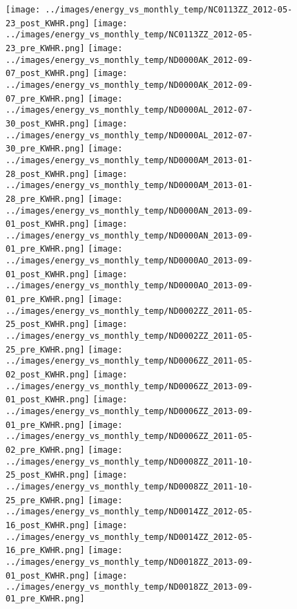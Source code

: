 \clearpage
\begin{figure}
\centering
\texttt{[image: ../images/energy\_vs\_monthly\_temp/NC0113ZZ\_2012-05-23\_post\_KWHR.png]}
\texttt{[image: ../images/energy\_vs\_monthly\_temp/NC0113ZZ\_2012-05-23\_pre\_KWHR.png]}
\texttt{[image: ../images/energy\_vs\_monthly\_temp/ND0000AK\_2012-09-07\_post\_KWHR.png]}
\texttt{[image: ../images/energy\_vs\_monthly\_temp/ND0000AK\_2012-09-07\_pre\_KWHR.png]}
\texttt{[image: ../images/energy\_vs\_monthly\_temp/ND0000AL\_2012-07-30\_post\_KWHR.png]}
\texttt{[image: ../images/energy\_vs\_monthly\_temp/ND0000AL\_2012-07-30\_pre\_KWHR.png]}
\texttt{[image: ../images/energy\_vs\_monthly\_temp/ND0000AM\_2013-01-28\_post\_KWHR.png]}
\texttt{[image: ../images/energy\_vs\_monthly\_temp/ND0000AM\_2013-01-28\_pre\_KWHR.png]}
\texttt{[image: ../images/energy\_vs\_monthly\_temp/ND0000AN\_2013-09-01\_post\_KWHR.png]}
\texttt{[image: ../images/energy\_vs\_monthly\_temp/ND0000AN\_2013-09-01\_pre\_KWHR.png]}
\texttt{[image: ../images/energy\_vs\_monthly\_temp/ND0000AO\_2013-09-01\_post\_KWHR.png]}
\texttt{[image: ../images/energy\_vs\_monthly\_temp/ND0000AO\_2013-09-01\_pre\_KWHR.png]}
\texttt{[image: ../images/energy\_vs\_monthly\_temp/ND0002ZZ\_2011-05-25\_post\_KWHR.png]}
\texttt{[image: ../images/energy\_vs\_monthly\_temp/ND0002ZZ\_2011-05-25\_pre\_KWHR.png]}
\texttt{[image: ../images/energy\_vs\_monthly\_temp/ND0006ZZ\_2011-05-02\_post\_KWHR.png]}
\texttt{[image: ../images/energy\_vs\_monthly\_temp/ND0006ZZ\_2013-09-01\_post\_KWHR.png]}
\texttt{[image: ../images/energy\_vs\_monthly\_temp/ND0006ZZ\_2013-09-01\_pre\_KWHR.png]}
\texttt{[image: ../images/energy\_vs\_monthly\_temp/ND0006ZZ\_2011-05-02\_pre\_KWHR.png]}
\texttt{[image: ../images/energy\_vs\_monthly\_temp/ND0008ZZ\_2011-10-25\_post\_KWHR.png]}
\texttt{[image: ../images/energy\_vs\_monthly\_temp/ND0008ZZ\_2011-10-25\_pre\_KWHR.png]}
\texttt{[image: ../images/energy\_vs\_monthly\_temp/ND0014ZZ\_2012-05-16\_post\_KWHR.png]}
\texttt{[image: ../images/energy\_vs\_monthly\_temp/ND0014ZZ\_2012-05-16\_pre\_KWHR.png]}
\texttt{[image: ../images/energy\_vs\_monthly\_temp/ND0018ZZ\_2013-09-01\_post\_KWHR.png]}
\texttt{[image: ../images/energy\_vs\_monthly\_temp/ND0018ZZ\_2013-09-01\_pre\_KWHR.png]}
\end{figure}
